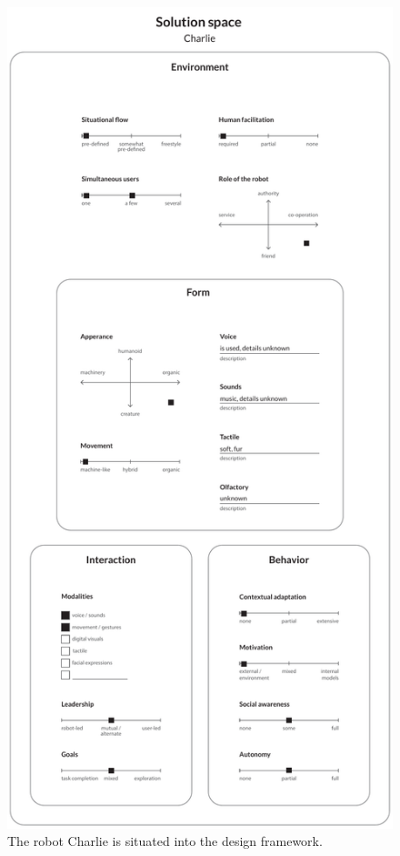 \begin{figure}
\centering
  \includegraphics[scale=0.40]{images/solution_charlie-01.pdf}
  \caption{The robot Charlie is situated into the design framework.}
  \label{fig:charlieDesign}
\end{figure}

